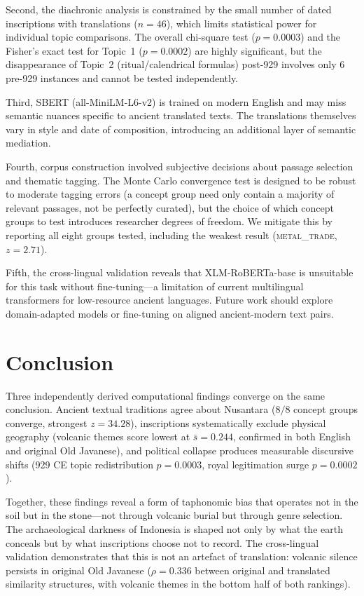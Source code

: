 \documentclass[12pt]{article}
\begin{document}
Second, the diachronic analysis is constrained by the small number of dated inscriptions with translations ($n = 46$), which limits statistical power for individual topic comparisons.
The overall chi-square test ($p = 0.0003$) and the Fisher's exact test for Topic~1 ($p = 0.0002$) are highly significant, but the disappearance of Topic~2 (ritual/calendrical formulas) post-929 involves only 6 pre-929 instances and cannot be tested independently.

Third, SBERT (all-MiniLM-L6-v2) is trained on modern English and may miss semantic nuances specific to ancient translated texts.
The translations themselves vary in style and date of composition, introducing an additional layer of semantic mediation.

Fourth, corpus construction involved subjective decisions about passage selection and thematic tagging.
The Monte Carlo convergence test is designed to be robust to moderate tagging errors (a concept group need only contain a majority of relevant passages, not be perfectly curated), but the choice of which concept groups to test introduces researcher degrees of freedom.
We mitigate this by reporting all eight groups tested, including the weakest result (\textsc{metal\_trade}, $z = 2.71$).

Fifth, the cross-lingual validation reveals that XLM-RoBERTa-base is unsuitable for this task without fine-tuning---a limitation of current multilingual transformers for low-resource ancient languages.
Future work should explore domain-adapted models or fine-tuning on aligned ancient-modern text pairs.


\section{Conclusion}

Three independently derived computational findings converge on the same conclusion.
Ancient textual traditions agree about Nusantara ($8/8$ concept groups converge, strongest $z = 34.28$), inscriptions systematically exclude physical geography (volcanic themes score lowest at $\bar{s} = 0.244$, confirmed in both English and original Old Javanese), and political collapse produces measurable discursive shifts (929 CE topic redistribution $p = 0.0003$, royal legitimation surge $p = 0.0002$).

Together, these findings reveal a form of taphonomic bias that operates not in the soil but in the stone---not through volcanic burial but through genre selection.
The archaeological darkness of Indonesia is shaped not only by what the earth conceals but by what inscriptions choose not to record.
The cross-lingual validation demonstrates that this is not an artefact of translation: volcanic silence persists in original Old Javanese ($\rho = 0.336$ between original and translated similarity structures, with volcanic themes in the bottom half of both rankings).
\end{document}
